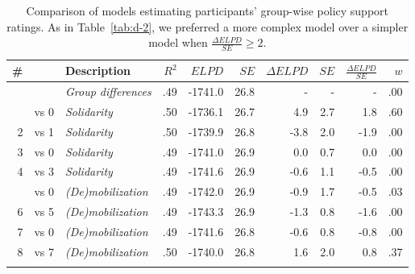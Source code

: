 \documentclass[12pt, a4paper]{article}
\begin{document}
\begin{table}
\centering
{}
\caption{Comparison of models estimating participants' group-wise policy support ratings. As in Table~\ref{tab:d-2}, we preferred a more complex model over a simpler model when $\frac{\Delta\textit{ELPD}}{\textit{SE}} \geq 2$.}
\small	
\begin{tabularx}{\linewidth}{r@{~}rXrrrrrrr} \toprule
\# &  &  Description & $R^2$ & $\textit{ELPD}$ & $\textit{SE}$ & $\Delta\textit{ELPD}$ & $\textit{SE}$ & $\frac{\Delta\textit{ELPD}}{\textit{SE}}$ & $w$ \\ \midrule \addlinespace
0 &      & \textit{Group differences} & .49 & -1741.0 & 26.8 & - & - & - & .00 \\ \addlinespace
1 & vs 0 & \textit{Solidarity}       & .50 & -1736.1 & 26.7 &  4.9 & 2.7 & 1.8 & .60 \\
2 & vs 1 & \textit{Solidarity}       & .50 & -1739.9 & 26.8 &   -3.8 & 2.0 & -1.9 & .00 \\
3 & vs 0 & \textit{Solidarity}       & .49 & -1741.0 & 26.9 & 0.0 & 0.7 & 0.0 & .00 \\
4 & vs 3 & \textit{Solidarity}       & .49 & -1741.6 & 26.9 &  -0.6 & 1.1 & -0.5 & .00 \\ \addlinespace
5 & vs 0 & \textit{(De)mobilization} & .49 & -1742.0 & 26.9 & -0.9 & 1.7 & -0.5 & .03 \\
6 & vs 5 & \textit{(De)mobilization} & .49 & -1743.3 & 26.9 & -1.3 & 0.8 & -1.6 & .00\\
7 & vs 0 & \textit{(De)mobilization} & .49 & -1741.6 & 26.8 & -0.6 & 0.8 & -0.8 & .00\\
8 & vs 7 & \textit{(De)mobilization} & .50 & -1740.0 & 26.8 &  1.6 & 2.0 & 0.8 & .37 \\ \addlinespace \bottomrule
\end{tabularx}
\label{tab:e-3}
\end{table}
\end{document}
